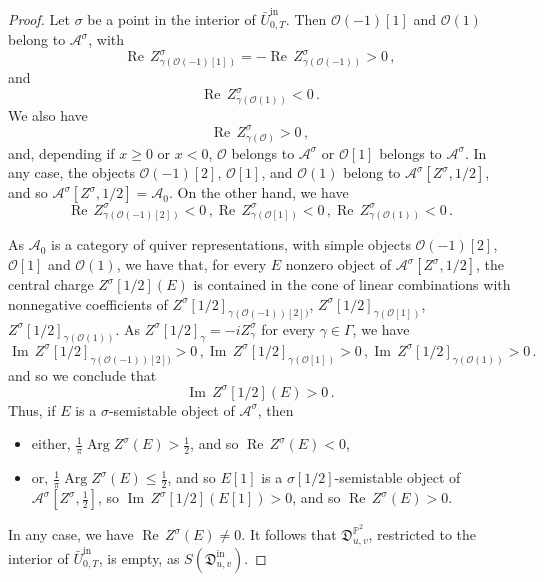 \documentclass[12pt, a4paper]{amsart}
\newcommand\PP{\mathbb P}
\newcommand\cA{\mathcal A}
\newcommand\cO{\mathcal O}
\newcommand\fD{\mathfrak D}
\newcommand\Arg{\operatorname{Arg}}
\newcommand\Rea{\operatorname{Re}\,}
\newcommand\Ima{\operatorname{Im}\,}
\newcommand\iin{\mathrm{in}}
\begin{document}
\begin{proof}
Let $\sigma$ be a point in the interior of $\bar{U}^\iin_{0,T}$.
Then $\cO(-1)[1]$ and $\cO(1)$ belong to 
$\cA^\sigma$, with 
\[\Rea Z^\sigma_{\gamma(\cO(-1)[1])}=-\Rea Z^\sigma_{\gamma(\cO(-1))}>0\,,\]
and
\[\Rea Z^\sigma_{\gamma(\cO(1))}<0\,.\]
We also have 
\[ \Rea Z^\sigma_{\gamma(\cO)}>0\,,\]
and, depending if $x \geqslant 0$ or 
$x<0$, $\cO$ belongs to $\cA^\sigma$ or 
$\cO[1]$ belongs to 
$\cA^\sigma$.
In any case, the objects $\cO(-1)[2]$, $\cO[1]$, and $\cO(1)$ belong to $\cA^\sigma[Z^\sigma,1/2]$, and so 
$\cA^\sigma[Z^\sigma, 1/2]=\cA_0$.
On the other hand, we have 
\[ \Rea Z_{\gamma(\cO(-1)[2])}^\sigma 
<0\,, \Rea Z_{\gamma(\cO[1])}^\sigma<0 \,,
\Rea Z_{\gamma(\cO(1))}^\sigma <0\,.\]





As $\cA_0$ is a category of quiver representations, with simple objects 
$\cO(-1)[2]$, $\cO[1]$ and $\cO(1)$, we have that, for every $E$ nonzero object of 
$\cA^\sigma[Z^\sigma,1/2]$, the central charge
$Z^\sigma[1/2](E)$ is contained in the cone of linear combinations with 
nonnegative coefficients of 
$Z^\sigma[1/2]_{\gamma(\cO(-1))[2])}$,
$Z^\sigma[1/2]_{\gamma(\cO[1])}
$, 
$Z^\sigma[1/2]_{\gamma(\cO(1))}$.
As $Z^\sigma[1/2]_\gamma=-i Z^\sigma_\gamma$ for every $\gamma \in \Gamma$, 
we have  
\[ \Ima Z^\sigma[1/2]_{\gamma(\cO(-1))[2])}>0\,,
\Ima Z^\sigma[1/2]_{\gamma(\cO[1])}>0
\,,
\Ima Z^\sigma[1/2]_{\gamma(\cO(1))}>0\,.\]
and so
we conclude that 
\[\Ima Z^\sigma[1/2](E)>0\,.\]
Thus, if $E$ is a $\sigma$-semistable object of $\cA^\sigma$, then 
\begin{itemize}
\item[(i)] either, $\frac{1}{\pi} \Arg Z^\sigma(E)>\frac{1}{2}$, and so 
$\Rea Z^\sigma(E)<0$,
\item[(ii)] or, $\frac{1}{\pi} \Arg Z^{\sigma}(E) 
\leqslant \frac{1}{2}$, and so $E[1]$
is a $\sigma[1/2]$-semistable object 
of $\cA^\sigma[Z^\sigma, \frac{1}{2}]$, so
$\Ima Z^\sigma[1/2](E[1])>0$, and so
$\Rea Z^\sigma(E)>0$.
\end{itemize}
In any case, we have $\Rea Z^\sigma(E) \neq 0$. It follows that $\fD^{\PP^2}_{u,v}$, restricted to the interior of 
$\bar{U}_{0,T}^{\iin}$, is empty, as 
$S(\fD^\iin_{u,v})$.


\end{proof}
\end{document}
